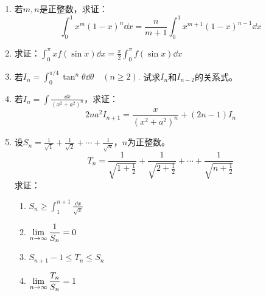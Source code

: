 \begin{enumerate}
\item 若$m,n$是正整数，求证：
\[\int^1_0 x^m (1-x)^n\dd x=\frac{n}{m+1}\int^1_0x^{m+1}(1-x)^{n-1}\dd x \]
\item 求证：$\displaystyle\int^\pi_0 xf(\sin x)\dd x=\frac{\pi}{2}\int^\pi_0f(\sin x)\dd x$
\item 若$I_n=\displaystyle\int^{\pi/4}_0 \tan^n \theta \dd \theta\quad (n\ge 2)$. 试求$I_n$和$I_{n-2}$的关系式。
\item 若$I_n=\displaystyle\int \frac{\dd x}{(x^2+a^2)^n}$，求证：
\[2na^2I_{n+1}=\frac{x}{(x^2+a^2)^n}+(2n-1)I_n\]
\item 设$S_n=\frac{1}{\sqrt{1}}+\frac{1}{\sqrt{2}}+\cdots+\frac{1}{\sqrt{n}}$，$n$为正整数。
\[T_n=\frac{1}{\sqrt{1+\frac{1}{2}}}+\frac{1}{\sqrt{2+\frac{1}{2}}}+\cdots+\frac{1}{\sqrt{n+\frac{1}{2}}}\]
求证：
\begin{multicols}{2}
\begin{enumerate}
    \item $S_n\ge \displaystyle\int^{n+1}_1 \frac{\dd x}{\sqrt{x}}$
    \item $\displaystyle\lim_{n\to\infty}\dfrac{1}{S_n}=0$
    \item $S_{n+1}-1\le T_n\le S_n$
    \item $\displaystyle\lim_{n\to\infty}\dfrac{T_n}{S_n}=1$
\end{enumerate}
\end{multicols}


\end{enumerate}
